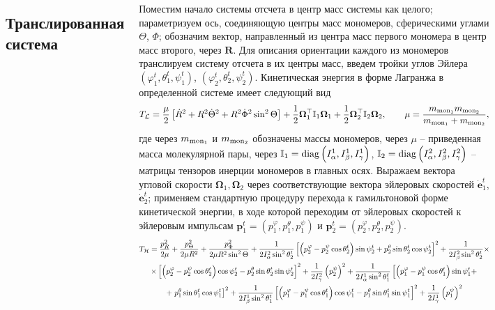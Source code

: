 \documentclass[
  14pt,
  a1paper,
  portrait, 
  margin=0mm,
  innermargin=15mm,
  blockverticalspace=0mm,
  colspace=0mm,
  subcolspace=0mm
]{tikzposter}
\newcommand{\lb}{\left(}
\newcommand{\rb}{\right)}
\newcommand{\lsq}{\left[}
\newcommand{\rsq}{\right]}
\newcommand{\mL}{\mathcal{L}}
\newcommand{\mH}{\mathcal{H}}
\newcommand{\bbI}{\mathbb{I}}
\newcommand{\bOmega}{\boldsymbol{\Omega}}
\begin{document}
\begin{columns}
{	\subsection*{Транслированная система}
	Поместим начало системы отсчета в центр масс системы как целого; параметризуем ось, соединяющую центры масс мономеров, сферическими углами $\Theta$, $\Phi$; обозначим вектор, направленный из центра масс первого мономера в центр масс второго, через $\mathbf{R}$. Для описания ориентации каждого из мономеров транслируем систему отсчета в их центры масс, введем тройки углов Эйлера $\lb \varphi_1^t, \theta_1^t, \psi_1^t \rb$, $\lb \varphi_2^t, \theta_2^t, \psi_2^t \rb$. Кинетическая энергия в форме Лагранжа в определенной системе имеет следующий вид
	\begin{gather}
		T_\mL = \frac{\mu}{2} \lsq \dot{R}^2 + R^2 \dot{\Theta}^2 + R^2 \dot{\Phi}^2 \sin^2 \Theta \rsq + \frac{1}{2} \bOmega_1^\top \bbI_1 \bOmega_1 + \frac{1}{2} \bOmega_2^\top \bbI_2 \bOmega_2, \qquad \mu = \frac{m_{\textup{mon}_1} m_{\textup{mon}_2}}{m_{\textup{mon}_1} + m_{\textup{mon}_2}}, \label{1.3} 
	\end{gather}
	где через $m_{\textup{mon}_1}$ и $m_{\textup{mon}_2}$ обозначены массы мономеров, через $\mu$ -- приведенная масса молекулярной пары, через $\bbI_1 = \textup{diag} \lb I_\alpha^1, I_\beta^1, I_\gamma^1 \rb $, $\bbI_2 = \textup{diag} \lb I_\alpha^2, I_\beta^2, I_\gamma^2 \rb $ -- матрицы тензоров инерции мономеров в главных осях. Выражаем вектора угловой скорости $\bOmega_1, \bOmega_2$ через соответствующие вектора эйлеровых скоростей $\dot{\mathbf{e}}_1^t$, $\dot{\mathbf{e}}_2^t$; применяем стандартную процедуру перехода к гамильтоновой форме кинетической энергии, в ходе которой переходим от эйлеровых скоростей к эйлеровым импульсам $\mathbf{p}_1^t = \lb p_1^\varphi, p_1^\theta, p_1^\psi \rb$ и $\mathbf{p}_2^t = \lb p_2^\varphi, p_2^\theta, p_2^\psi \rb$.   
	\vspace*{-0.3cm}
	\begin{gather}
		T_\mH = \frac{p_R^2}{2\mu} + \frac{p_\Theta^2}{2 \mu R^2} + \frac{p_\Phi^2}{2 \mu R^2 \sin^2 \Theta} + \frac{1}{2 I_\alpha^2 \sin^2 \theta_2^t} \lsq \lb p_2^\varphi - p_2^\psi \cos \theta_2^t \rb \sin \psi_2^t + p_2^\theta \sin \theta_2^t \cos \psi_2^t \rsq^2 + \frac{1}{2 I_\beta^2 \sin^2 \theta_2^t} \times \notag \\
		\times \lsq \lb p_2^\varphi - p_2^\psi \cos \theta_2^t \rb \cos \psi_2^t  - p_2^\theta \sin \theta_2^t \sin \psi_2^t \rsq^2 + \frac{1}{2 I_\gamma^2} \lb p_2^\psi \rb^2 + \frac{1}{2 I_\alpha^1 \sin^2 \theta_1^t} \lsq \lb p_1^\varphi - p_1^\psi \cos \theta_1^t \rb \sin \psi_1^t + \right. \notag \\ 
		+ \left. p_1^\theta \sin \theta_1^t \cos \psi_1^t \rsq^2 + \frac{1}{2 I_\beta^1 \sin^2 \theta_1^t} \lsq \lb p_1^\varphi - p_1^\psi \cos \theta_1^t \rb \cos \psi_1^t - p_1^\theta \sin \theta_1^t \sin \psi_1^t \rsq^2 + \frac{1}{2 I_\gamma^1} \lb p_1^\psi \rb^2 \label{1.4}   
	\end{gather}

}
\end{columns}
\end{document}
